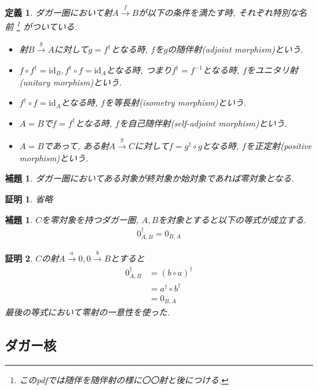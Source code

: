 \documentclass[a4paper,12pt]{ltjsarticle}
\theoremstyle{break}
\newtheorem{defn}[thm]{定義}
\newtheorem{lem}[thm]{補題}
\newtheorem*{prf}{証明}
\newcommand{\xr}[1]{\xrightarrow{#1}}
\newcommand{\id}{\mathrm{id}}
\newcommand{\ci}{\circ}
\newcommand{\da}{\dagger}
\numberwithin{equation}{section}
\begin{document}
\begin{defn}
  ダガー圏において射$A \xr{f} B$が以下の条件を満たす時, それぞれ特別な名前
  \footnote{
    このpdfでは随伴を随伴射の様に〇〇射と後につける.  
  }
  がついている.
  \begin{itemize}
    \item 射$B \xr{g} A$に対して$g=f^\da$となる時, $f$を$g$の随伴射(adjoint morphism)という. 
    \item $f \ci f^\da = \id_B, f^\da \ci f = \id_A$となる時, つまり$f^\da=f^{-1}$となる時, $f$をユニタリ射(unitary morphism)という. 
    \item $f^\da \ci f = \id_A$となる時, $f$を等長射(isometry morphism)という.
    \item $A=B$で$f=f^\da$となる時, $f$を自己随伴射(self-adjoint morphism)という. 
    \item $A=B$であって, ある射$A \xr{g} C$に対して$f=g^\da \ci g$となる時, $f$を正定射(positive morphism)という. 
  \end{itemize}
\end{defn} 

\begin{lem}
  ダガー圏においてある対象が終対象か始対象であれば零対象となる. 
\end{lem}

\begin{prf}
  省略
\end{prf}

\begin{lem}
  $C$を零対象を持つダガー圏, $A,B$を対象とすると以下の等式が成立する. 
  \begin{align*}
    0_{A,B}^\da = 0_{B,A}
  \end{align*}
\end{lem}

\begin{prf}
  $C$の射$A \xr{a} 0, 0 \xr{b} B$とすると
  \begin{align*}
    0_{A,B}^\da
    &= (b \ci a)^\da \\
    &= a^\da \ci b^\da \\
    &= 0_{B,A}  
  \end{align*}
  最後の等式において零射の一意性を使った. 
\end{prf}

\subsection{ダガー核}
\end{document}
